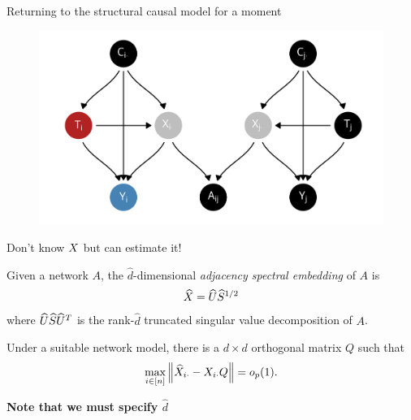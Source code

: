 \documentclass[aspectratio=169]{beamer}
\theoremstyle{remark}
\begin{document}
\begin{frame}{Returning to the structural causal model for a moment}

    \centering

    \begin{figure}
        \includegraphics[scale=0.7]{figures/dags/homophily-mediating.png}
    \end{figure}

\end{frame}

\begin{frame}{Don't know $X$ but can estimate it!}

    \begin{definition}[ASE]

        Given a network $A$, the $\widehat{d}$-dimensional \emph{adjacency spectral embedding} of $A$ is
        \begin{align*}
            \widehat{X} = \widehat{U} \widehat{S}^{1/2}
        \end{align*}
        \noindent where $\widehat{U} \widehat{S} \widehat{U}^T$ is the rank-$\widehat{d}$ truncated singular value decomposition of $A$.
    \end{definition}

    \begin{lemma}
        Under a suitable network model, there is a $d \times d$ orthogonal matrix $Q$ such that
        \begin{equation*}
            \max_{i \in [n]} \, \norm*{\Xhat_{i \cdot} - \X_{i \cdot} Q} = \op{1}.
        \end{equation*}
    \end{lemma}

    \centering

    \textbf{Note that we must specify $\widehat{d}$}
\end{frame}
\end{document}

